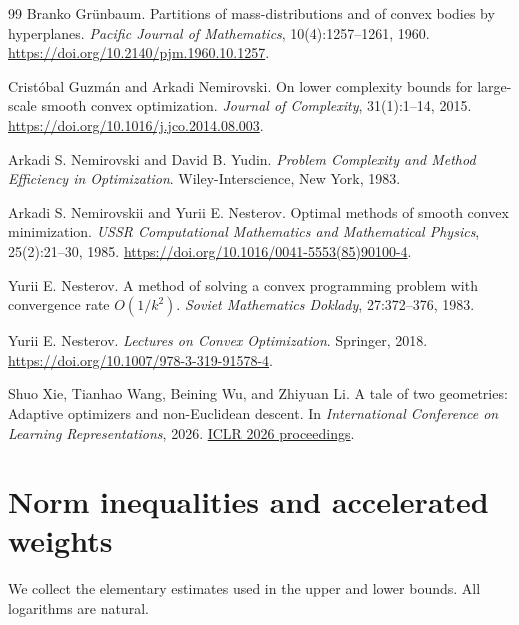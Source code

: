 \documentclass[11pt]{article}
\theoremstyle{definition}
\theoremstyle{remark}
\begin{document}
\begin{thebibliography}{99}
Branko Gr\"unbaum.
Partitions of mass-distributions and of convex bodies by hyperplanes.
\emph{Pacific Journal of Mathematics}, 10(4):1257--1261, 1960.
\url{https://doi.org/10.2140/pjm.1960.10.1257}.

Crist\'obal Guzm\'an and Arkadi Nemirovski.
On lower complexity bounds for large-scale smooth convex optimization.
\emph{Journal of Complexity}, 31(1):1--14, 2015.
\url{https://doi.org/10.1016/j.jco.2014.08.003}.

Arkadi S. Nemirovski and David B. Yudin.
\emph{Problem Complexity and Method Efficiency in Optimization}.
Wiley-Interscience, New York, 1983.

Arkadi S. Nemirovskii and Yurii E. Nesterov.
Optimal methods of smooth convex minimization.
\emph{USSR Computational Mathematics and Mathematical Physics}, 25(2):21--30, 1985.
\url{https://doi.org/10.1016/0041-5553(85)90100-4}.

Yurii E. Nesterov.
A method of solving a convex programming problem with convergence rate $O(1/k^2)$.
\emph{Soviet Mathematics Doklady}, 27:372--376, 1983.

Yurii E. Nesterov.
\emph{Lectures on Convex Optimization}.
Springer, 2018.
\url{https://doi.org/10.1007/978-3-319-91578-4}.

Shuo Xie, Tianhao Wang, Beining Wu, and Zhiyuan Li.
A tale of two geometries: Adaptive optimizers and non-Euclidean descent.
In \emph{International Conference on Learning Representations}, 2026.
\href{https://proceedings.iclr.cc/paper_files/paper/2026/hash/7c79d0964c8fc3674dcf1737e8afe89f-Abstract-Conference.html}{ICLR 2026 proceedings}.

\end{thebibliography}

\clearpage
\appendix
{}

\section{Norm inequalities and accelerated weights}
\label{app:preliminaries}

We collect the elementary estimates used in the upper and lower bounds.
All logarithms are natural.
\end{document}
